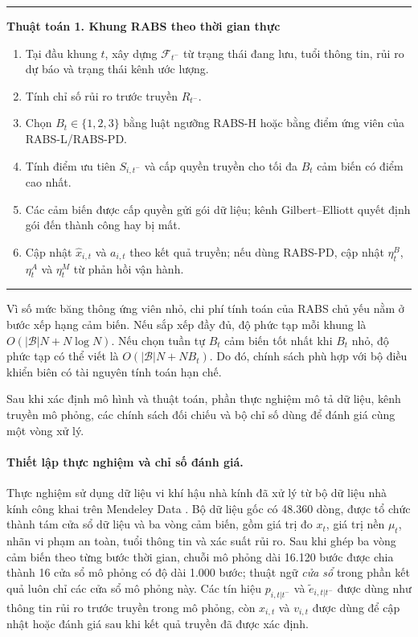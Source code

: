 \documentclass[10pt]{article}
\begin{document}
\begin{center}
\begin{minipage}{0.92\linewidth}
\hrule
\vspace{0.4em}
\textbf{Thuật toán 1. Khung RABS theo thời gian thực}
\begin{enumerate}
    \item Tại đầu khung $t$, xây dựng $\mathcal{F}_{t^-}$ từ trạng thái đang lưu, tuổi thông tin, rủi ro dự báo và trạng thái kênh ước lượng.
    \item Tính chỉ số rủi ro trước truyền $R_{t^-}$.
    \item Chọn $B_t\in\{1,2,3\}$ bằng luật ngưỡng RABS-H hoặc bằng điểm ứng viên của RABS-L/RABS-PD.
    \item Tính điểm ưu tiên $S_{i,t^-}$ và cấp quyền truyền cho tối đa $B_t$ cảm biến có điểm cao nhất.
    \item Các cảm biến được cấp quyền gửi gói dữ liệu; kênh Gilbert--Elliott quyết định gói đến thành công hay bị mất.
    \item Cập nhật $\hat{x}_{i,t}$ và $a_{i,t}$ theo kết quả truyền; nếu dùng RABS-PD, cập nhật $\eta^B_t$, $\eta^A_t$ và $\eta^M_t$ từ phản hồi vận hành.
\end{enumerate}
\vspace{0.2em}
\hrule
\end{minipage}
\end{center}

Vì số mức băng thông ứng viên nhỏ, chi phí tính toán của RABS chủ yếu nằm ở bước xếp hạng cảm biến. Nếu sắp xếp đầy đủ, độ phức tạp mỗi khung là $O(|\mathcal{B}|N+N\log N)$. Nếu chọn tuần tự $B_t$ cảm biến tốt nhất khi $B_t$ nhỏ, độ phức tạp có thể viết là $O(|\mathcal{B}|N+NB_t)$. Do đó, chính sách phù hợp với bộ điều khiển biên có tài nguyên tính toán hạn chế.

Sau khi xác định mô hình và thuật toán, phần thực nghiệm mô tả dữ liệu, kênh truyền mô phỏng, các chính sách đối chiếu và bộ chỉ số dùng để đánh giá cùng một vòng xử lý.

\paragraph{Thiết lập thực nghiệm và chỉ số đánh giá.}
Thực nghiệm sử dụng dữ liệu vi khí hậu nhà kính đã xử lý từ bộ dữ liệu nhà kính công khai trên Mendeley Data \cite{greenhouse2021mendeley}. Bộ dữ liệu gốc có 48.360 dòng, được tổ chức thành tám cửa sổ dữ liệu và ba vòng cảm biến, gồm giá trị đo $x_t$, giá trị nền $\mu_t$, nhãn vi phạm an toàn, tuổi thông tin và xác suất rủi ro. Sau khi ghép ba vòng cảm biến theo từng bước thời gian, chuỗi mô phỏng dài 16.120 bước được chia thành 16 cửa sổ mô phỏng có độ dài 1.000 bước; thuật ngữ \emph{cửa sổ} trong phần kết quả luôn chỉ các cửa sổ mô phỏng này. Các tín hiệu $p_{i,t|t^-}$ và $\tilde e_{i,t|t^-}$ được dùng như thông tin rủi ro trước truyền trong mô phỏng, còn $x_{i,t}$ và $v_{i,t}$ được dùng để cập nhật hoặc đánh giá sau khi kết quả truyền đã được xác định.
\end{document}
